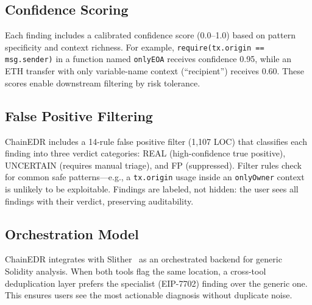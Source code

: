 \subsection{Confidence Scoring}

Each finding includes a calibrated confidence score (0.0--1.0) based on pattern specificity and context richness. For example, \texttt{require(tx.origin == msg.sender)} in a function named \texttt{onlyEOA} receives confidence 0.95, while an ETH transfer with only variable-name context (``recipient'') receives 0.60. These scores enable downstream filtering by risk tolerance.

\subsection{False Positive Filtering}

ChainEDR includes a 14-rule false positive filter (1,107 LOC) that classifies each finding into three verdict categories: REAL (high-confidence true positive), UNCERTAIN (requires manual triage), and FP (suppressed). Filter rules check for common safe patterns---e.g., a \texttt{tx.origin} usage inside an \texttt{onlyOwner} context is unlikely to be exploitable. Findings are labeled, not hidden: the user sees all findings with their verdict, preserving auditability.

\subsection{Orchestration Model}

ChainEDR integrates with Slither~\cite{slither} as an orchestrated backend for generic Solidity analysis. When both tools flag the same location, a cross-tool deduplication layer prefers the specialist (EIP-7702) finding over the generic one. This ensures users see the most actionable diagnosis without duplicate noise.
